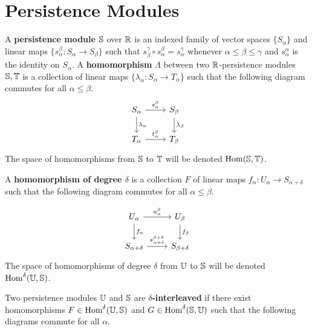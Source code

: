 
\section{Persistence Modules}

A \textbf{persistence module} $\S$ over $\R$ is an indexed family of vector spaces $\{S_\alpha\}$ and linear maps $\{s_\alpha^\beta : S_\alpha\to S_\beta\}$ such that $s^\gamma_\beta\circ s_\alpha^\beta = s_\alpha^\gamma$ whenever $\alpha\leq\beta\leq\gamma$ and $s_\alpha^\alpha$ is the identity on $S_\alpha$.
A \textbf{homomorphism} $\Lambda$ between two $\R$-persistence modules $\S, \T$ is a collection of linear maps $\{\lambda_\alpha : S_\alpha\to T_\alpha\}$ such that the following diagram commutes for all $\alpha\leq\beta$.
\begin{equation}\label{dgm:homomorphism}
  \begin{tikzcd}
    S_\alpha\arrow{r}{s_\alpha^\beta}\arrow{d}{\lambda_\alpha} &
    S_\beta\arrow{d}{\lambda_\beta}\\
    T_\alpha\arrow{r}{t_\alpha^\beta} &
    T_\beta
\end{tikzcd}\end{equation}
The space of homomorphisms from $\S$ to $\T$ will be denoted $\Hom(\S, \T)$.

A \textbf{homomorphism of degree $\delta$} is a collection $F$ of linear maps $f_\alpha : U_\alpha\to S_{\alpha+\delta}$ such that the following diagram commutes for all $\alpha\leq\beta$.

\begin{equation}\label{dgm:shifted_homomorphism}
  \begin{tikzcd}
    U_\alpha\arrow{r}{u_\alpha^\beta}\arrow{d}{f_\alpha} &
    U_\beta\arrow{d}{f_\beta}\\
    S_{\alpha+\delta}\arrow{r}{s_{\alpha+\delta}^{\beta+\delta}} &
    S_{\beta +\delta}
\end{tikzcd}\end{equation}
The space of homomorphisms of degree $\delta$ from $\U$ to $\S$ will be denoted $\Hom^\delta(\U, \S)$.

Two persistence modules $\U$ and $\S$ are \textbf{$\delta$-interleaved} if there exist homomorphisms $F\in\Hom^\delta(\U, \S)$ and $G \in\Hom^\delta(\S,\U)$ such that the following diagrams commute for all $\alpha$.

